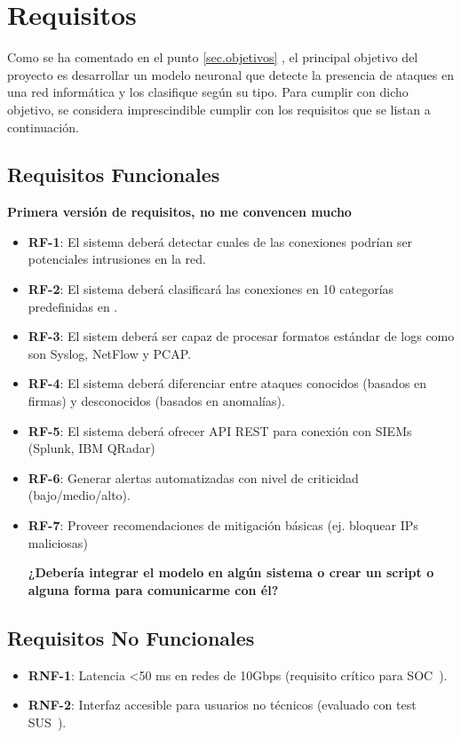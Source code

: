 \section{Requisitos}  \label{sec.requisitos} 
Como se ha comentado en el punto \ref{sec.objetivos} , 
el principal objetivo del proyecto es desarrollar un modelo neuronal que detecte la presencia de ataques en una red informática y los clasifique según su tipo. Para cumplir con dicho objetivo, se considera imprescindible cumplir con los requisitos que se listan a continuación.

\subsection{Requisitos Funcionales}   \label{sec.req-funcionales}
\textbf{Primera versión de requisitos, no me convencen mucho}
\begin{itemize}  
    \item \textbf{RF-1}: El sistema deberá detectar cuales de las conexiones podrían ser potenciales intrusiones en la red.
    \item \textbf{RF-2}: El sistema deberá clasificará las conexiones en 10 categorías predefinidas en .  
	\item \textbf{RF-3}: El sistem deberá ser capaz de procesar formatos estándar de logs como son Syslog, NetFlow y PCAP.
	\item \textbf{RF-4}: El sistema deberá diferenciar entre ataques conocidos (basados en firmas) y desconocidos (basados en anomalías).
	\item \textbf{RF-5}: El sistema deberá ofrecer API REST para conexión con SIEMs (Splunk, IBM QRadar)
	\item \textbf{RF-6}: Generar alertas automatizadas con nivel de criticidad (bajo/medio/alto).
	\item \textbf{RF-7}: Proveer recomendaciones de mitigación básicas (ej. bloquear IPs maliciosas)

	
	
\textbf{¿Debería integrar el modelo en algún sistema o crear un script o alguna forma para comunicarme con él?}
		
\end{itemize}  

\subsection{Requisitos No Funcionales}   \label{sec.req-no-funcionales}
\begin{itemize}  
    \item \textbf{RNF-1}: Latencia <50 ms en redes de 10Gbps (requisito crítico para SOC~\cite{nist2021ai}).  
    \item \textbf{RNF-2}: Interfaz accesible para usuarios no técnicos (evaluado con test SUS~\cite{brooke1996sus}).  
\end{itemize}  

